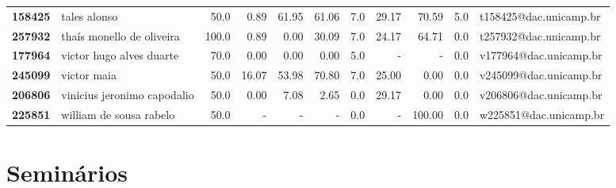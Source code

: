 \documentclass[11pt]{article}
\begin{document}
\begin{center}
\begin{landscape}
\begin{longtable}{llrrrrrrrrl}
\textbf{158425} &                           tales alonso &                  50.0 &        0.89 &       61.95 &       61.06 &                      7.0 &       29.17 &       70.59 &                        5.0 &  t158425@dac.unicamp.br \\
\textbf{257932} &              thaís monello de oliveira &                 100.0 &        0.89 &        0.00 &       30.09 &                      7.0 &       24.17 &       64.71 &                        0.0 &  t257932@dac.unicamp.br \\
\textbf{177964} &               victor hugo alves duarte &                  70.0 &        0.00 &        0.00 &        0.00 &                      5.0 &           - &           - &                        0.0 &  v177964@dac.unicamp.br \\
\textbf{245099} &                            victor maia &                  50.0 &       16.07 &       53.98 &       70.80 &                      7.0 &       25.00 &        0.00 &                        0.0 &  v245099@dac.unicamp.br \\
\textbf{206806} &            vinicius jeronimo capodalio &                  50.0 &        0.00 &        7.08 &        2.65 &                      0.0 &       29.17 &        0.00 &                        0.0 &  v206806@dac.unicamp.br \\
\textbf{225851} &                william de sousa rabelo &                  50.0 &           - &           - &           - &                      0.0 &           - &      100.00 &                        0.0 &  w225851@dac.unicamp.br \\
\end{longtable}
\end{landscape}\end{center}





\section{Seminários}
\label{sec:org0b98e41}
\end{document}

